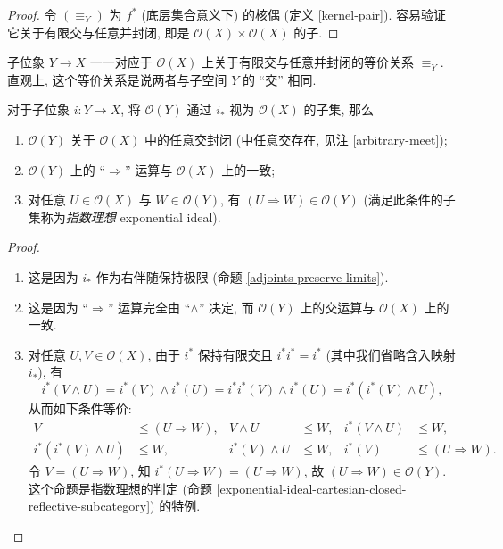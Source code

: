 \begin{proof}
	令 $(\equiv_Y)$ 为 $f^*$ (底层集合意义下) 的核偶 (定义 \ref{kernel-pair}). 容易验证它关于有限交与任意并封闭, 即是 $\mathcal O(X)\times\mathcal O(X)$ 的子\fm{}.
\end{proof}

子位象 $Y\to X$ 一一对应于 $\mathcal O(X)$ 上关于有限交与任意并封闭的等价关系 $\equiv_Y$. 直观上, 这个等价关系是说两者与子空间 $Y$ 的 ``交'' 相同.


\begin{prop}
	[label={sublocale-exponential-ideal}]
	{}
	对于子位象 $i\colon Y\to X$, 将 $\mathcal O(Y)$ 通过 $i_*$ 视为 $\mathcal O(X)$ 的子集,
	那么
	\begin{enumerate}[(1)]
		\item $\mathcal O(Y)$ 关于 $\mathcal O(X)$ 中的任意交封闭 (\fm{}中任意交存在, 见注 \ref{arbitrary-meet});
		\item $\mathcal O(Y)$ 上的 ``$\Rightarrow$'' 运算与 $\mathcal O(X)$ 上的一致;
		\item 对任意 $U\in\mathcal O(X)$ 与 $W\in\mathcal O(Y)$, 有 $(U\Rightarrow W)\in \mathcal O(Y)$ (满足此条件的子集称为\emph{指数理想} exponential ideal).
	\end{enumerate}
\end{prop}
\begin{proof}~
	\begin{enumerate}
		[(1)]
		\item 这是因为 $i_*$ 作为右伴随保持极限 (命题 \ref{adjoints-preserve-limits}).
		\item 这是因为 ``$\Rightarrow$'' 运算完全由 ``$\land$'' 决定, 而 $\mathcal O(Y)$ 上的交运算与 $\mathcal O(X)$ 上的一致.
		\item 对任意 $U,V\in\mathcal O(X)$, 由于 $i^*$ 保持有限交且 $i^*i^*=i^*$ (其中我们省略含入映射 $i_*$), 有
		\[
		i^*(V\land U) = i^*(V)\land i^*(U) = i^*i^*(V)\land i^*(U) = i^*(i^*(V)\land U),
		\]
		从而如下条件等价:
		\begin{align*}
			V&\leq (U\Rightarrow W) , &
			V\land U&\leq W, &
			i^*(V\land U)&\leq W,\\
			i^*(i^*(V)\land U)&\leq W,&
			i^*(V)\land U&\leq W,&
			i^*(V)&\leq (U\Rightarrow W).
		\end{align*}
		令 $V=(U\Rightarrow W)$, 知 $i^*(U\Rightarrow W) = (U\Rightarrow W)$, 故 $(U\Rightarrow W)\in \mathcal O(Y)$.
		这个命题是指数理想的判定 (命题 \ref{exponential-ideal-cartesian-closed-reflective-subcategory}) 的特例.
	\end{enumerate}
\end{proof}

